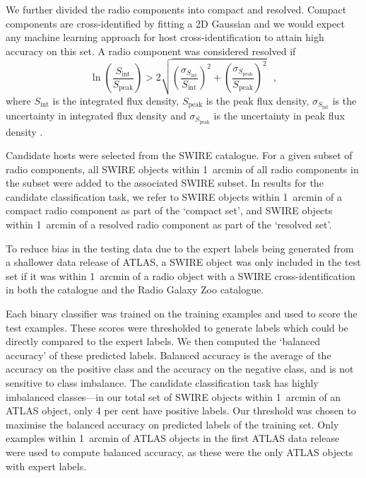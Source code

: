 \documentclass[11pt, a4paper]{book}
\begin{document}
    We further divided the radio components into compact and resolved. Compact
    components are cross-identified by fitting a 2D Gaussian \citep[as
    in][]{norris06} and we would expect any machine learning approach for host
    cross-identification to attain high accuracy on this set. A radio component was
    considered resolved if
    \begin{equation}
      \label{eq:atlas-compact}
        \ln \left(
          \frac{S_{\text{int}}}{S_{\text{peak}}}
        \right) > 2\sqrt{\left(
          \frac{\sigma_{S_{\text{int}}}}{S_{\text{int}}}
        \right)^2 + \left(
          \frac{\sigma_{S_{\text{peak}}}}{S_{\text{peak}}}
        \right)^2}\,\,\,\,,
    \end{equation}%
    where \(S_{\text{int}}\) is the integrated flux density,
    \(S_{\text{peak}}\) is the peak flux density, {$\sigma_{S_{\text{int}}}$ is
    the uncertainty in integrated flux density and $\sigma_{S_{\text{peak}}}$
    is the uncertainty in peak flux density} \citep[following][]{franzen15}.

    Candidate hosts were selected from the SWIRE catalogue. For a given subset
    of radio components, all SWIRE objects within 1~arcmin of all radio
    components in the subset were added to the associated SWIRE subset. In results
    for the candidate classification task, we refer to SWIRE objects
    within 1~arcmin of a compact radio component as part of the `compact set',
    and SWIRE objects within 1~arcmin of a resolved radio component as part of
    the `resolved set'.

    To reduce bias in the testing data due to the expert labels being
    generated from a shallower data release of ATLAS, a SWIRE object was only
    included in the test set if it was within 1~arcmin of a radio object with
    a SWIRE cross-identification in both the \citet{norris06} catalogue and the
    Radio Galaxy Zoo catalogue.

    Each binary classifier was trained on the training examples and used to
    {score the test examples. These scores were thresholded to generate labels which could be directly compared
    to the expert labels. We then computed the `balanced accuracy' of these predicted labels.} Balanced
    accuracy is the average of the accuracy on the positive class and the
    accuracy on the negative class, and is not sensitive to class imbalance.
    The candidate classification task has highly imbalanced classes---in our
    total set of SWIRE objects within 1~arcmin of an ATLAS object, only 4 per
    cent have positive labels. {Our threshold was chosen to maximise the balanced
    accuracy on predicted labels of the training set.} Only examples within 1~arcmin of ATLAS objects
    in the first ATLAS data release \citep{norris06} were used to compute
    balanced accuracy, as these were the only ATLAS objects with expert labels.
\end{document}
